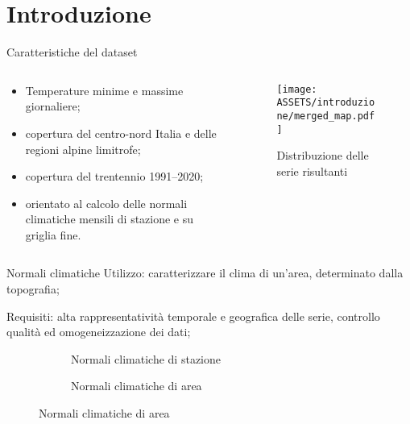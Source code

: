 
\section{Introduzione}

\begin{frame}{Caratteristiche del dataset}
  \begin{columns}
    \begin{column}{0.5\textwidth}
      \begin{itemize}
        \item Temperature minime e massime giornaliere;
        \item copertura del centro-nord Italia e delle regioni alpine limitrofe;
        \item copertura del trentennio 1991--2020;
        \item orientato al calcolo delle normali climatiche mensili di stazione e su griglia fine.
      \end{itemize}
    \end{column}
    \begin{column}{0.5\textwidth}
      \begin{figure}
        \texttt{[image: ASSETS/introduzione/merged\_map.pdf]}
        \caption*{Distribuzione delle serie risultanti}
      \end{figure}
    \end{column}
  \end{columns}
\end{frame}

\begin{frame}{Normali climatiche}
  Utilizzo: caratterizzare il clima di un'area, determinato dalla topografia;

  Requisiti: alta rappresentatività temporale e geografica delle serie, controllo qualità ed omogeneizzazione dei dati;
  \begin{figure}
    \centering
    \begin{subtable}[m]{0.3\textwidth}
      \centering
      \footnotesize
      
      \caption*{Dato meteorologico giornaliero}
    \end{subtable}
    \hfill
    \begin{subfigure}[m]{0.3\textwidth}
      \centering
      
      \caption*{Normali climatiche di stazione}
    \end{subfigure}
    \hfill
    \begin{subfigure}[m]{0.3\textwidth}
      
      \caption*{Normali climatiche di area}
    \end{subfigure}
  \end{figure}
\end{frame}

